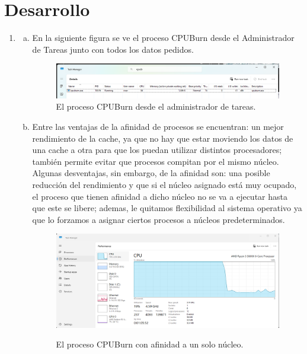 \documentclass[12pt]{article}
\begin{document}
  \section{Desarrollo}
  \begin{enumerate}[1.]
    \item \begin{enumerate}[a.]
      \item En la siguiente figura se ve el proceso CPUBurn desde el Administrador de Tareas junto con todos los datos pedidos.
	\begin{figure}[H]
	  \centering
	  \includegraphics[width=\linewidth]{../imagenes/Administrador-tareas.png}
	  \caption{El proceso CPUBurn desde el administrador de tareas.}
	  \label{fig:cpuburn-administrador-tareas}
	\end{figure}

      \item Entre las ventajas de la afinidad de procesos se encuentran: un mejor rendimiento de la cache, ya que no hay que estar moviendo los datos de una cache a otra para que los puedan utilizar distintos procesadores; también permite evitar que procesos compitan por el mismo núcleo. Algunas desventajas, sin embargo, de la afinidad son: una posible reducción del rendimiento y que si el núcleo asignado está muy ocupado, el proceso que tienen afinidad a dicho núcleo no se va a ejecutar hasta que este se libere; ademas, le quitamos flexibilidad al sistema operativo ya que lo forzamos a asignar ciertos procesos a núcleos predeterminados.
	\begin{figure}[H]
	  \centering
	  \includegraphics[width=\linewidth]{../imagenes/cpuburn-un-procesador.png}
	  \label{fig:cpuburn-afinidad}
	  \caption{El proceso CPUBurn con afinidad a un solo núcleo.}
	\end{figure}


\end{enumerate}
\end{enumerate}
\end{document}
